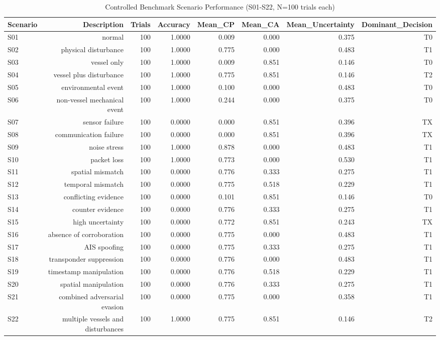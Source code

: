 \begin{table}[htbp]
\centering
\caption{Controlled Benchmark Scenario Performance (S01-S22, N=100 trials each)}
\begin{tabular}{lrrrrrrr}
\toprule
Scenario & Description & Trials & Accuracy & Mean\_CP & Mean\_CA & Mean\_Uncertainty & Dominant\_Decision \\
\midrule
S01 & normal & 100 & 1.0000 & 0.009 & 0.000 & 0.375 & T0 \\
S02 & physical disturbance & 100 & 1.0000 & 0.775 & 0.000 & 0.483 & T1 \\
S03 & vessel only & 100 & 1.0000 & 0.009 & 0.851 & 0.146 & T0 \\
S04 & vessel plus disturbance & 100 & 1.0000 & 0.775 & 0.851 & 0.146 & T2 \\
S05 & environmental event & 100 & 1.0000 & 0.100 & 0.000 & 0.483 & T0 \\
S06 & non-vessel mechanical event & 100 & 1.0000 & 0.244 & 0.000 & 0.375 & T0 \\
S07 & sensor failure & 100 & 0.0000 & 0.000 & 0.851 & 0.396 & TX \\
S08 & communication failure & 100 & 0.0000 & 0.000 & 0.851 & 0.396 & TX \\
S09 & noise stress & 100 & 1.0000 & 0.878 & 0.000 & 0.483 & T1 \\
S10 & packet loss & 100 & 1.0000 & 0.773 & 0.000 & 0.530 & T1 \\
S11 & spatial mismatch & 100 & 0.0000 & 0.776 & 0.333 & 0.275 & T1 \\
S12 & temporal mismatch & 100 & 0.0000 & 0.775 & 0.518 & 0.229 & T1 \\
S13 & conflicting evidence & 100 & 0.0000 & 0.101 & 0.851 & 0.146 & T0 \\
S14 & counter evidence & 100 & 0.0000 & 0.776 & 0.333 & 0.275 & T1 \\
S15 & high uncertainty & 100 & 0.0000 & 0.772 & 0.851 & 0.243 & TX \\
S16 & absence of corroboration & 100 & 0.0000 & 0.775 & 0.000 & 0.483 & T1 \\
S17 & AIS spoofing & 100 & 0.0000 & 0.775 & 0.333 & 0.275 & T1 \\
S18 & transponder suppression & 100 & 0.0000 & 0.776 & 0.000 & 0.483 & T1 \\
S19 & timestamp manipulation & 100 & 0.0000 & 0.776 & 0.518 & 0.229 & T1 \\
S20 & spatial manipulation & 100 & 0.0000 & 0.776 & 0.333 & 0.275 & T1 \\
S21 & combined adversarial evasion & 100 & 0.0000 & 0.775 & 0.000 & 0.358 & T1 \\
S22 & multiple vessels and disturbances & 100 & 1.0000 & 0.775 & 0.851 & 0.146 & T2 \\
\bottomrule
\end{tabular}
\end{table}
